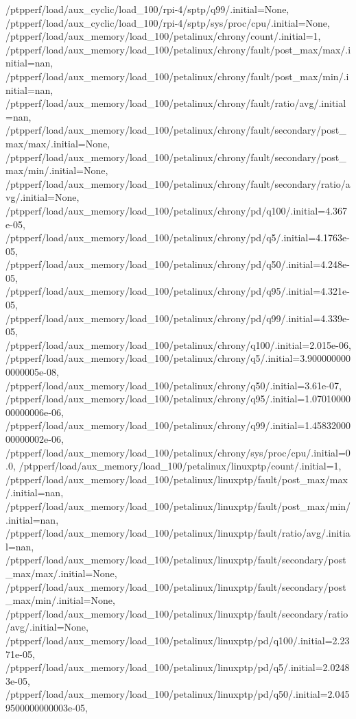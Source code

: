 {    /ptpperf/load/aux_cyclic/load_100/rpi-4/sptp/q99/.initial=None,
    /ptpperf/load/aux_cyclic/load_100/rpi-4/sptp/sys/proc/cpu/.initial=None,
    /ptpperf/load/aux_memory/load_100/petalinux/chrony/count/.initial=1,
    /ptpperf/load/aux_memory/load_100/petalinux/chrony/fault/post_max/max/.initial=nan,
    /ptpperf/load/aux_memory/load_100/petalinux/chrony/fault/post_max/min/.initial=nan,
    /ptpperf/load/aux_memory/load_100/petalinux/chrony/fault/ratio/avg/.initial=nan,
    /ptpperf/load/aux_memory/load_100/petalinux/chrony/fault/secondary/post_max/max/.initial=None,
    /ptpperf/load/aux_memory/load_100/petalinux/chrony/fault/secondary/post_max/min/.initial=None,
    /ptpperf/load/aux_memory/load_100/petalinux/chrony/fault/secondary/ratio/avg/.initial=None,
    /ptpperf/load/aux_memory/load_100/petalinux/chrony/pd/q100/.initial=4.367e-05,
    /ptpperf/load/aux_memory/load_100/petalinux/chrony/pd/q5/.initial=4.1763e-05,
    /ptpperf/load/aux_memory/load_100/petalinux/chrony/pd/q50/.initial=4.248e-05,
    /ptpperf/load/aux_memory/load_100/petalinux/chrony/pd/q95/.initial=4.321e-05,
    /ptpperf/load/aux_memory/load_100/petalinux/chrony/pd/q99/.initial=4.339e-05,
    /ptpperf/load/aux_memory/load_100/petalinux/chrony/q100/.initial=2.015e-06,
    /ptpperf/load/aux_memory/load_100/petalinux/chrony/q5/.initial=3.9000000000000005e-08,
    /ptpperf/load/aux_memory/load_100/petalinux/chrony/q50/.initial=3.61e-07,
    /ptpperf/load/aux_memory/load_100/petalinux/chrony/q95/.initial=1.0701000000000006e-06,
    /ptpperf/load/aux_memory/load_100/petalinux/chrony/q99/.initial=1.4583200000000002e-06,
    /ptpperf/load/aux_memory/load_100/petalinux/chrony/sys/proc/cpu/.initial=0.0,
    /ptpperf/load/aux_memory/load_100/petalinux/linuxptp/count/.initial=1,
    /ptpperf/load/aux_memory/load_100/petalinux/linuxptp/fault/post_max/max/.initial=nan,
    /ptpperf/load/aux_memory/load_100/petalinux/linuxptp/fault/post_max/min/.initial=nan,
    /ptpperf/load/aux_memory/load_100/petalinux/linuxptp/fault/ratio/avg/.initial=nan,
    /ptpperf/load/aux_memory/load_100/petalinux/linuxptp/fault/secondary/post_max/max/.initial=None,
    /ptpperf/load/aux_memory/load_100/petalinux/linuxptp/fault/secondary/post_max/min/.initial=None,
    /ptpperf/load/aux_memory/load_100/petalinux/linuxptp/fault/secondary/ratio/avg/.initial=None,
    /ptpperf/load/aux_memory/load_100/petalinux/linuxptp/pd/q100/.initial=2.2371e-05,
    /ptpperf/load/aux_memory/load_100/petalinux/linuxptp/pd/q5/.initial=2.02483e-05,
    /ptpperf/load/aux_memory/load_100/petalinux/linuxptp/pd/q50/.initial=2.0459500000000003e-05,
}
